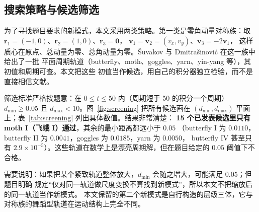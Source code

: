 \documentclass[UTF8,fontset=windows,11pt,a4paper]{ctexart}
\newcommand{\vect}[1]{\mathbf{#1}}
\begin{document}
\subsection{搜索策略与候选筛选}
为了寻找题目要求的新模式，本文采用两类策略。第一类是零角动量对称族：取
$\vect r_1=(-1,0)$、$\vect r_2=(1,0)$、$\vect r_3=\vect0$，
$\vect v_1=\vect v_2=(v_x,v_y)$、$\vect v_3=-2\vect v_1$，
这样质心在原点、总动量为零、总角动量为零。Šuvakov 与 Dmitrašinović 在这一族中给出了一批
平面周期轨道（butterfly、moth、goggles、yarn、yin-yang 等），其初值和周期可查。本文把这些
初值当作候选，用自己的积分器独立检验，而不是直接相信文献。

筛选标准严格按题意：在 $0\le t\le50$ 内（周期短于 50 的积分一个周期）
$d_{\min}\ge0.05$ 且 $d_{\max}<10$。图~\ref{fig:screening} 把所有候选画在
$(d_{\min},d_{\max})$ 平面上；表~\ref{tab:screening} 列出具体数值。结果非常清楚：
\textbf{15 个已发表候选里只有 moth I（飞蛾 I）通过}，其余的最小距离都远小于 $0.05$
（butterfly I 为 $0.0110$，butterfly II 为 $0.0041$，goggles 为 $0.0185$，yarn 为 $0.0050$，
butterfly IV 甚至只有 $2.9\times10^{-5}$）。这些轨道在数学上是漂亮周期解，但在题目给定的
$0.05$ 阈值下不合格。

需要说明：如果把某个紧致轨道整体放大，$d_{\min}$ 会随之增大，可能满足 $0.05$；但题目明确
规定“仅对同一轨道做尺度变换不算找到新模式”，所以本文不把缩放后的同一轨道当作新模式。
本文保留的第二个新模式是自行构造的层级三体，它与对称族的舞蹈型轨道在运动结构上完全不同。
\end{document}
